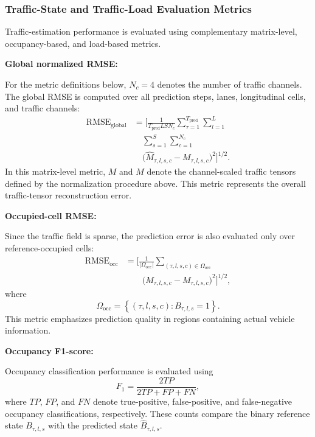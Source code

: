 \documentclass[journal]{IEEEtran}
\begin{document}
\subsubsection{Traffic-State and Traffic-Load Evaluation Metrics}

Traffic-estimation performance is evaluated using complementary matrix-level, occupancy-based, and load-based metrics.

\textbf{Global normalized RMSE:}

For the metric definitions below, $N_c=4$ denotes the number of traffic channels. The global RMSE is computed over all prediction steps, lanes, longitudinal cells, and traffic channels:
\begin{equation}
\begin{aligned}
\mathrm{RMSE}_{\mathrm{global}}&=\Biggl[\frac{1}{T_{\mathrm{pred}}LSN_c}\sum_{\tau=1}^{T_{\mathrm{pred}}}\sum_{l=1}^{L}\\
&\quad\sum_{s=1}^{S}\sum_{c=1}^{N_c}\\
&\quad\bigl(\widehat{M}_{\tau,l,s,c}-M_{\tau,l,s,c}\bigr)^2\Biggr]^{1/2}.
\end{aligned}
\end{equation}
In this matrix-level metric, $M$ and $\widehat{M}$ denote the channel-scaled traffic tensors defined by the normalization procedure above. This metric represents the overall traffic-tensor reconstruction error.

\textbf{Occupied-cell RMSE:}

Since the traffic field is sparse, the prediction error is also evaluated only over reference-occupied cells:
\begin{equation}
\begin{aligned}
\mathrm{RMSE}_{\mathrm{occ}}&=\Biggl[\frac{1}{|\Omega_{\mathrm{occ}}|}\sum_{(\tau,l,s,c)\in\Omega_{\mathrm{occ}}}\\
&\qquad\bigl(\widehat{M}_{\tau,l,s,c}-M_{\tau,l,s,c}\bigr)^2\Biggr]^{1/2},
\end{aligned}
\end{equation}
where
\begin{equation}
\Omega_{\mathrm{occ}}=\left\{(\tau,l,s,c):B_{\tau,l,s}=1\right\}.
\end{equation}
This metric emphasizes prediction quality in regions containing actual vehicle information.

\textbf{Occupancy F1-score:}

Occupancy classification performance is evaluated using
\begin{equation}
F_1=\frac{2TP}{2TP+FP+FN},
\end{equation}
where $TP$, $FP$, and $FN$ denote true-positive, false-positive, and false-negative occupancy classifications, respectively. These counts compare the binary reference state $B_{\tau,l,s}$ with the predicted state $\widehat{B}_{\tau,l,s}$.
\end{document}
